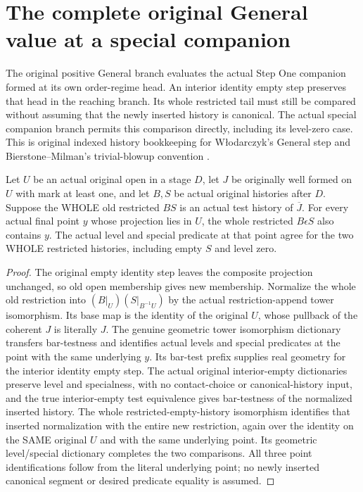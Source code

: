 \section{The complete original General value at a special companion}

The original positive General branch evaluates the actual Step One companion
formed at its own order-regime head. An interior identity empty step preserves
that head in the reaching branch. Its whole restricted tail must still be
compared without assuming that the newly inserted history is canonical.
The actual special companion branch permits this comparison directly, including
its level-zero case. This is original indexed history bookkeeping for
W\l odarczyk's General step and Bierstone--Milman's trivial-blowup convention
\cite{wlodarczyk05-hironaka,bierstone-milman08-functoriality}.

\begin{theorem}
\label{hir:original-whole-restricted-empty-special-dictionary}
\leanok
{}
Let $U$ be an actual original open in a stage $D$, let $J$ be originally
well formed on $U$ with mark at least one, and let $B,S$ be actual original
histories after $D$. Suppose the WHOLE old restricted $BS$ is an actual
test history of $\overline J$. For every actual final point $y$ whose
projection lies in $U$, the whole restricted $B\epsilon S$ also contains
$y$. The actual level and special predicate at that point agree for the
two WHOLE restricted histories, including empty $S$ and level zero.
\end{theorem}
\begin{proof}
The original empty identity step leaves the composite projection unchanged,
so old open membership gives new membership. Normalize the whole old
restriction into $(B|_U)(S|_{B^{-1}U})$ by the actual restriction-append
tower isomorphism. Its base map is the identity of the original $U$, whose
pullback of the coherent $J$ is literally $J$. The genuine geometric tower
isomorphism dictionary transfers bar-testness and identifies actual levels
and special predicates at the point with the same underlying $y$.
Its bar-test prefix supplies real geometry for the interior identity empty
step. The actual original interior-empty dictionaries preserve level and
specialness, with no contact-choice or canonical-history input, and the true
interior-empty test equivalence gives bar-testness of the normalized inserted
history. The whole restricted-empty-history isomorphism identifies that
inserted normalization with the entire new restriction, again over the
identity on the SAME original $U$ and with the same underlying point.
Its geometric level/special dictionary completes the two comparisons.
All three point identifications follow from the literal underlying point;
no newly inserted canonical segment or desired predicate equality is assumed.
\end{proof}

